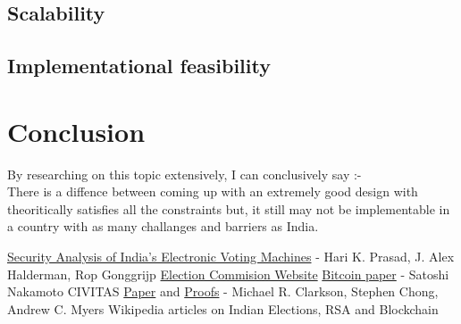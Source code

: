 \documentclass[12pt]{report}
\begin{document}
\section{Scalability}
\section{Implementational feasibility}


\chapter{Conclusion}
By researching on this topic extensively, I can conclusively say :- 
\\
There is a diffence between coming up with an extremely good design with theoritically satisfies all the constraints but, it still may not be implementable in a country with as many challanges and barriers as India.

\begin{thebibliography}{9}
\href{https://indiaevm.org/evm_tr2010-jul29.pdf}{Security Analysis of India’s Electronic Voting Machines} - Hari K. Prasad, J. Alex Halderman, Rop Gonggrijp%
\href{http://eci.nic.in/eci_main1/current/StatusPaper-EVM.pdf}{Election Commision Website}
\href{https://bitcoin.org/bitcoin.pdf}{Bitcoin paper} - Satoshi Nakamoto
CIVITAS \href{https://www.cs.cornell.edu/projects/civitas/papers/clarkson_civitas.pdf}{Paper} and \href{https://www.cs.cornell.edu/~clarkson/papers/clarkson_civitas_tr.pdf}{Proofs} - Michael R. Clarkson, Stephen Chong, Andrew C. Myers 
Wikipedia articles on Indian Elections, RSA and Blockchain
\end{thebibliography}
\end{document}
